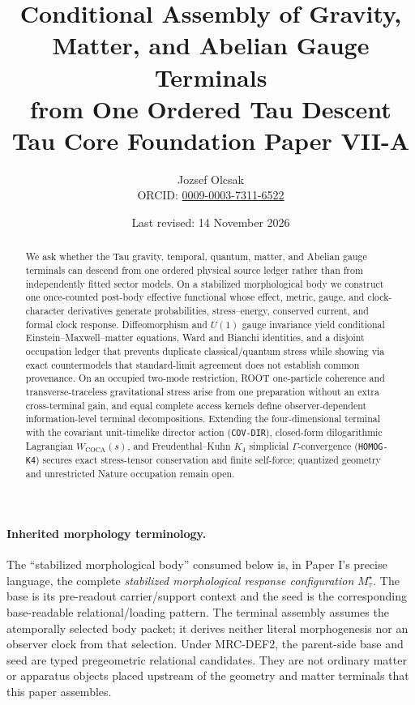 \documentclass[11pt]{article}
\title{Conditional Assembly of Gravity, Matter, and Abelian Gauge Terminals\\
from One Ordered Tau Descent\\
\large Tau Core Foundation Paper VII-A}
\author{Jozsef Olcsak\\{\small ORCID: \href{https://orcid.org/0009-0003-7311-6522}{0009-0003-7311-6522}}}
\date{Last revised: 14 November 2026}
\begin{document}
\maketitle

\begin{abstract}
We ask whether the Tau gravity, temporal, quantum, matter, and Abelian gauge terminals can descend from one ordered physical source ledger rather than from independently fitted sector models. On a stabilized morphological body we construct one once-counted post-body effective functional whose effect, metric, gauge, and clock-character derivatives generate probabilities, stress--energy, conserved current, and formal clock response. Diffeomorphism and \(U(1)\) gauge invariance yield conditional Einstein--Maxwell--matter equations, Ward and Bianchi identities, and a disjoint occupation ledger that prevents duplicate classical/quantum stress while showing via exact countermodels that standard-limit agreement does not establish common provenance. On an occupied two-mode restriction, ROOT one-particle coherence and transverse-traceless gravitational stress arise from one preparation without an extra cross-terminal gain, and equal complete access kernels define observer-dependent information-level terminal decompositions. Extending the four-dimensional terminal with the covariant unit-timelike director action (\texttt{COV-DIR}), closed-form dilogarithmic Lagrangian \(W_{\mathrm{COCA}}(s)\), and Freudenthal--Kuhn \(K_4\) simplicial \(\Gamma\)-convergence (\texttt{HOMOG-K4}) secures exact stress-tensor conservation and finite self-force; quantized geometry and unrestricted Nature occupation remain open.
\end{abstract}

\paragraph{Inherited morphology terminology.}
The ``stabilized morphological body'' consumed below is, in Paper I's precise
language, the complete \emph{stabilized morphological response configuration}
$M_\tau^\star$.  The base is its pre-readout carrier/support context and the
seed is the corresponding base-readable relational/loading pattern.  The
terminal assembly assumes the atemporally selected body packet; it derives
neither literal morphogenesis nor an observer clock from that selection.
Under MRC-DEF2, the parent-side base and seed are typed pregeometric relational
candidates. They are not ordinary matter or apparatus objects placed upstream
of the geometry and matter terminals that this paper assembles.
\end{document}
